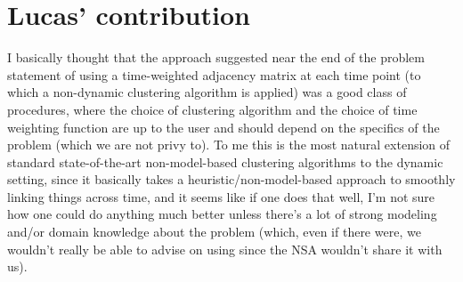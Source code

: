 \documentclass[11pt]{article}
\begin{document}
\section{Lucas' contribution}
I basically thought that the approach suggested near the end of the problem statement of using a time-weighted adjacency matrix at each time point (to which a non-dynamic clustering algorithm is applied) was a good class of procedures, where the choice of clustering algorithm and the choice of time weighting function are up to the user and should depend on the specifics of the problem (which we are not privy to). To me this is the most natural extension of standard state-of-the-art non-model-based clustering algorithms to the dynamic setting, since it basically takes a heuristic/non-model-based approach to smoothly linking things across time, and it seems like if one does that well, I'm not sure how one could do anything much better unless there's a lot of strong modeling and/or domain knowledge about the problem (which, even if there were, we wouldn't really be able to advise on using since the NSA wouldn't share it with us).
\end{document}
